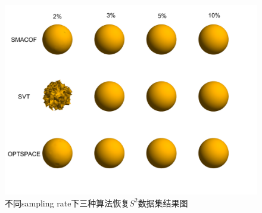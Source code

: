 \begin{figure}[h]
	\centering
	\includegraphics[width=1.0\textwidth]{figure/SpherePlot.png}
	\caption{不同sampling rate下三种算法恢复$S^2$数据集结果图}
 	\label{fig:sphere}
\end{figure}